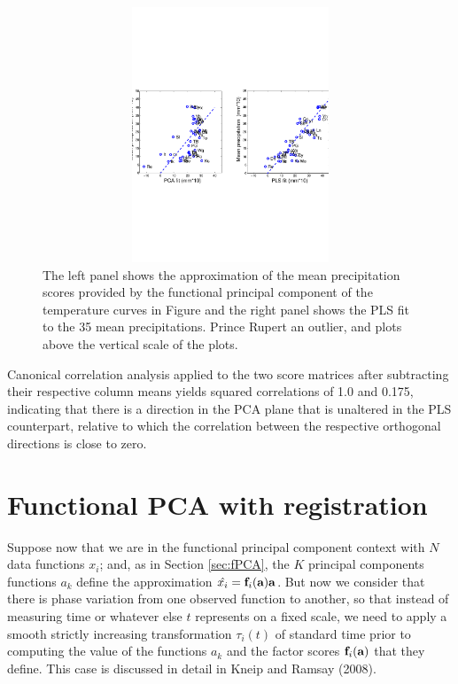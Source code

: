 \documentclass[12pt]{article}
\begin{document}
\begin{figure}
  \includegraphics[height=3in, width=6in]{figs/Daily_PCA_PLS_Fit}
  \caption{The left panel shows the approximation of the mean precipitation scores provided by the functional principal component of the temperature curves in Figure \label{Temperature} and the right panel shows the PLS fit to the 35 mean precipitations. Prince Rupert an outlier, and plots above the vertical scale of the plots.}
  \label{Daily_PCA_PLS_Fit}
\end{figure}

Canonical correlation analysis applied to the two score matrices after subtracting their respective column means yields squared correlations of 1.0 and 0.175, indicating that there is a direction in the PCA plane that is unaltered in the PLS counterpart, relative to which the correlation between the respective orthogonal directions is close to zero.


\section{Functional PCA with registration}
\label{fPCAReg}

Suppose now that we are in the functional principal component context with $N$ data functions $x_i$; and, as in Section \ref{sec:fPCA}, the $K$ principal components functions $a_k$ define the approximation $\hat{x_i} = \mbox{\bf f}_i(\mbox{\bf a}) \mbox{\bf a}$.  But now we consider that there is phase variation from one observed function to another, so that instead of measuring time or whatever else $t$ represents on a fixed scale, we need to apply a smooth strictly increasing transformation $\tau_i(t)$ of standard time prior to computing the value of the functions $a_k$ and the factor scores $\mbox{\bf f}_i(\mbox{\bf a})$ that they define.  This case is discussed in detail in Kneip and Ramsay (2008).
\end{document}
